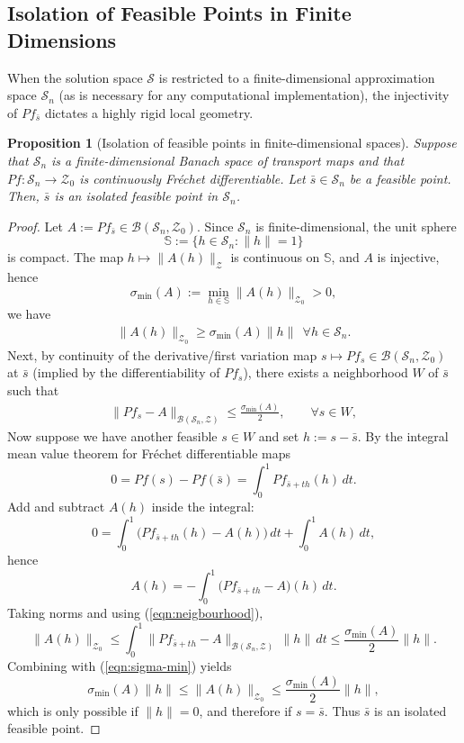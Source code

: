 \documentclass[12pt,leqno]{amsart}
\newtheorem{proposition}{Proposition}
\begin{document}
\subsection{Isolation of Feasible Points in Finite Dimensions}
When the solution space $\mathcal{S}$ is restricted to a finite-dimensional approximation space $\mathcal{S}_n$ (as is necessary for any computational implementation), the injectivity of $Pf_{\bar{s}}$ dictates a highly rigid local geometry.
\begin{proposition}[Isolation of feasible points in finite-dimensional spaces]
\label{prop:isolated-feasible}
Suppose that $\mathcal{S}_n$ is a finite-dimensional Banach space of transport maps and that $Pf:\mathcal{S}_n\to \mathcal{Z}_0$ is continuously Fr\'echet differentiable. Let $\bar{s} \in \mathcal{S}_n$ be a feasible point. Then, $\bar{s}$ is an isolated feasible point in $\mathcal{S}_n$.
\end{proposition}
\begin{proof}
Let $A:=P f_{\bar{s}}\in \mathcal{B}(\mathcal{S}_n,\mathcal{Z}_0)$. Since $\mathcal{S}_n$ is finite-dimensional, the unit sphere
\[
\mathbb S:=\{h\in\mathcal{S}_n:\|h\|=1\}
\]
is compact. The map $h\mapsto \|A(h)\|_{\mathcal{Z}}$ is continuous on $\mathbb S$, and $A$ is injective, hence
\[
\sigma_{\min}(A):=\min_{h\in\mathbb S}\|A(h)\|_{\mathcal{Z}_0}>0,
\]
we have
\begin{align}\label{eqn:sigma-min}
\|A(h)\|_{\mathcal{Z}_0}\ge \sigma_{\min}(A)\|h\|\ \ \forall h\in\mathcal{S}_n.     
\end{align}
Next, by continuity of the derivative/first variation map $s\mapsto P f_s\in\mathcal{B}(\mathcal{S}_n,\mathcal{Z}_0)$ at $\bar{s}$
(implied by the differentiability of $P f_s$),
there exists a neighborhood $W$ of $\bar{s}$ such that
\begin{align}\label{eqn:neigbourhood}
\|P f_s-A\|_{\mathcal{B}(\mathcal{S}_n,\mathcal{Z})}\le \frac{\sigma_{\min}(A)}{2},
\qquad \forall s\in W,   
\end{align}
Now suppose we have another feasible $s\in W$ and set $h:=s-\bar{s}$.
By the integral mean value theorem for Fr\'echet differentiable maps
\[
0=P f(s)-P f(\bar{s})=\int_0^1 P f_{\bar{s}+t h}(h)\,dt.
\]
Add and subtract $A(h)$ inside the integral:
\[
0=\int_0^1\bigl(P f_{\bar{s}+t h}(h)-A(h)\bigr)\,dt+\int_0^1 A(h)\,dt,
\]
hence
\[
A(h)=-\int_0^1\bigl(P f_{\bar{s}+t h}-A\bigr)(h)\,dt.
\]
Taking norms and using (\ref{eqn:neigbourhood}),
\[
\|A(h)\|_{\mathcal{Z}_0}
\le \int_0^1 \|P f_{\bar{s}+t h}-A\|_{\mathcal{B}(\mathcal{S}_n,\mathcal{Z})}\,\|h\|\,dt
\le \frac{\sigma_{\min}(A)}{2}\|h\|.
\]
Combining with (\ref{eqn:sigma-min}) yields
\[
\sigma_{\min}(A)\|h\|\le \|A(h)\|_{\mathcal{Z}_0}\le \frac{\sigma_{\min}(A)}{2}\|h\|,
\]
which is only possible if $\|h\|=0$, and therefore if $s=\bar{s}$. Thus $\bar{s}$ is an isolated feasible point.
\end{proof}
\end{document}
